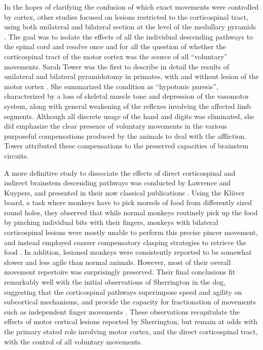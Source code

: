 In the hopes of clarifying the confusion of which exact movements were controlled by cortex, other studies focused on lesions restricted to the corticospinal tract, using both unilateral and bilateral section at the level of the medullary pyramids \cite{Tower1940,Lawrence1968,Lawrence1968a}. The goal was to isolate the effects of all the individual descending pathways to the spinal cord and resolve once and for all the question of whether the corticospinal tract of the motor cortex was the source of all ``voluntary'' movements. Sarah Tower was the first to describe in detail the results of unilateral and bilateral pyramidotomy in primates, with and without lesion of the motor cortex \cite{Tower1940}. She summarized the condition as ``hypotonic paresis'', characterized by a loss of skeletal muscle tone and depression of the vasomotor system, along with general weakening of the reflexes involving the affected limb segments. Although all discrete usage of the hand and digits was eliminated, she did emphasize the clear presence of voluntary movements in the various purposeful compensations produced by the animals to deal with the affliction. Tower attributed these compensations to the preserved capacities of brainstem circuits.

A more definitive study to dissociate the effects of direct corticospinal and indirect brainstem descending pathways was conducted by Lawrence and Kuypers, and presented in their now classical publications \cite{Lawrence1968,Lawrence1968a}. Using the Kl\"uver board, a task where monkeys have to pick morsels of food from differently sized round holes, they observed that while normal monkeys routinely pick up the food by pinching individual bits with their fingers, monkeys with bilateral corticospinal lesions were mostly unable to perform this precise pincer movement, and instead employed coarser compensatory clasping strategies to retrieve the food \cite{Lawrence1968}. In addition, lesioned monkeys were consistently reported to be somewhat slower and less agile than normal animals. However, most of their overall movement repertoire was surprisingly preserved. Their final conclusions fit remarkably well with the initial observations of Sherrington in the dog, suggesting that the corticospinal pathways superimpose speed and agility on subcortical mechanisms, and provide the capacity for fractionation of movements such as independent finger movements \cite{Lawrence1968}. These observations recapitulate the effects of motor cortical lesions reported by Sherrington, but remain at odds with the primary stated role involving motor cortex, and the direct corticospinal tract, with the control of all voluntary movements.

